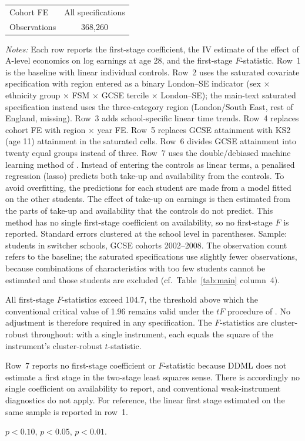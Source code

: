 \begin{table}[htbp]
\begin{tabular}{l ccc}
Cohort FE                                 & \multicolumn{3}{c}{All specifications} \\
Observations                              & \multicolumn{3}{c}{368,260} \\
\bottomrule
\end{tabular}
\begin{minipage}{\textwidth}
\smallskip
\footnotesize
\textit{Notes:} Each row reports the first-stage coefficient, the IV estimate of the effect of A-level economics on log earnings at age 28, and the first-stage $F$-statistic. Row~1 is the baseline with linear individual controls. Row~2 uses the saturated covariate specification with region entered as a binary London--SE indicator (sex $\times$ ethnicity group $\times$ FSM $\times$ GCSE tercile $\times$ London--SE); the main-text saturated specification instead uses the three-category region (London/South East, rest of England, missing). Row~3 adds school-specific linear time trends. Row~4 replaces cohort FE with region $\times$ year FE. Row~5 replaces GCSE attainment with KS2 (age 11) attainment in the saturated cells. Row~6 divides GCSE attainment into twenty equal groups instead of three. Row~7 uses the double/debiased machine learning method of \citet{chernozhukov2018dml}. Instead of entering the controls as linear terms, a penalised regression (lasso) predicts both take-up and availability from the controls. To avoid overfitting, the predictions for each student are made from a model fitted on the other students. The effect of take-up on earnings is then estimated from the parts of take-up and availability that the controls do not predict. This method has no single first-stage coefficient on availability, so no first-stage $F$ is reported. Standard errors clustered at the school level in parentheses. Sample: students in switcher schools, GCSE cohorts 2002--2008. The observation count refers to the baseline; the saturated specifications use slightly fewer observations, because combinations of characteristics with too few students cannot be estimated and those students are excluded (cf.\ Table~\ref{tab:main} column~4).

\smallskip
\noindent
All first-stage $F$-statistics exceed 104.7, the threshold above which the conventional critical value of 1.96 remains valid under the $tF$ procedure of \citet{lee2022valid}. No adjustment is therefore required in any specification. The $F$-statistics are cluster-robust throughout: with a single instrument, each equals the square of the instrument's cluster-robust $t$-statistic.

\smallskip
\noindent
Row~7 reports no first-stage coefficient or $F$-statistic because DDML does not estimate a first stage in the two-stage least squares sense. There is accordingly no single coefficient on availability to report, and conventional weak-instrument diagnostics do not apply. For reference, the linear first stage estimated on the same sample is reported in row~1.

\smallskip
\noindent
\sym{*} $p<0.10$, \sym{**} $p<0.05$, \sym{***} $p<0.01$.
\end{minipage}
\end{table}
